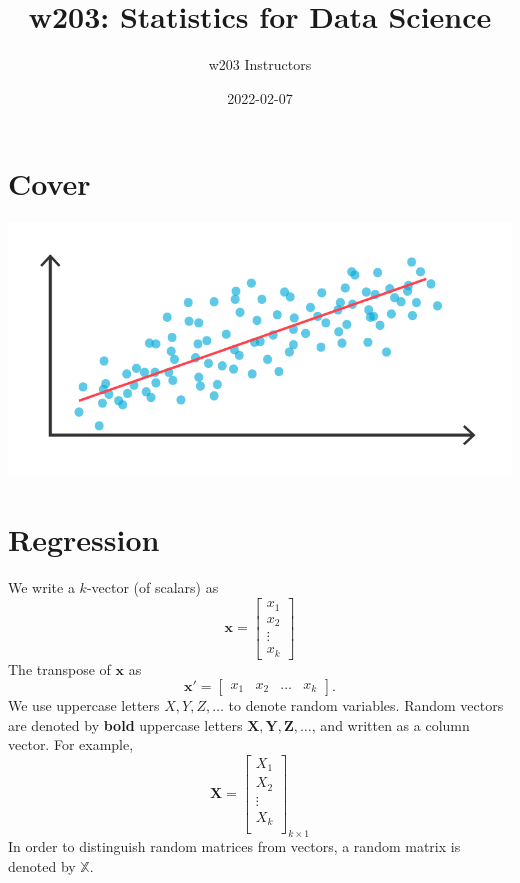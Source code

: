 \documentclass[
]{book}
\title{w203: Statistics for Data Science}
\author{w203 Instructors}
\date{2022-02-07}
\theoremstyle{definition}
\theoremstyle{definition}
\theoremstyle{definition}
\theoremstyle{definition}
\theoremstyle{remark}
\begin{document}
\maketitle

{
\setcounter{tocdepth}{1}
\tableofcontents
}
\newcommand{\E}[1]{{\mathbb{E}\left[ #1 \right]}}

\hypertarget{cover}{%
\chapter*{Cover}\label{cover}}

\includegraphics[width=0.85\linewidth]{./images/cover}

\hypertarget{regression}{%
\chapter{Regression}\label{regression}}

We write a \(k\)-vector (of scalars) as
\[
\pmb{x}=
\begin{bmatrix}
x_1 \\
x_2 \\
\vdots \\
x_k
\end{bmatrix}
\]
The transpose of \(\pmb{x}\) as
\[
\pmb{x}'=
\begin{bmatrix}
x_1 & x_2 & \ldots & x_k
\end{bmatrix}.
\]
We use uppercase letters \(X,Y,Z,\ldots\) to denote random variables. Random vectors are denoted by \textbf{bold} uppercase letters \(\pmb{X},\pmb{Y},\pmb{Z},\ldots\), and written as a column vector. For example, \[
\pmb{X}=
\begin{bmatrix}
X_{1}\\
X_{2}\\
\vdots \\
X_{k} \\
\end{bmatrix}_{k\times 1}
\]
In order to distinguish random matrices from vectors, a random matrix is denoted by \(\mathbb{X}\).
\end{document}
